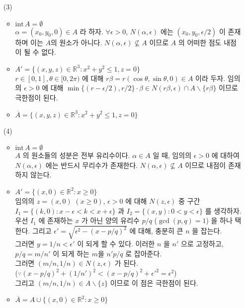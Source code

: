 \documentclass[12pt]{report}
\newcommand{\inte}{\mathrm{int}\,}
\newcommand{\bs}{\backslash}
\newcommand{\R}{\mathbb{R}}
\begin{document}
\begin{enumerate}
\begin{enumerate}
	\item[(3)]
	\begin{itemize}
		\item $\inte A = \emptyset $\\
		$\alpha = (x_0, y_0, 0) \in A$ 라 하자. $\forall \epsilon>0$, $N(\alpha, \epsilon)$ 에는 $(x_0, y_0, \epsilon/2)$ 이 존재하며 이는 $A$의 원소가 아니다. $N(\alpha, \epsilon) \nsubseteq A$ 이므로 $A$ 의 어떠한 점도 내점이 될 수 없다.
		\item $A' = \{(x, y, z)\in \R^3: x^2+y^2 \leq 1, z=0 \}$\\
		$r\in [0, 1], \theta \in [0, 2\pi)$ 에 대해 $r\beta = r(\cos\theta, \sin\theta, 0)\in A$ 이라 두자. 임의의 $\epsilon>0$ 에 대해 $\min\{(r - \epsilon/2), r/2\} \cdot \beta \in N(r\beta, \epsilon)\cap A\bs \{r\beta\}$ 이므로 극한점이 된다.
		\item $\overline{A} = \{(x, y, z)\in \R^3: x^2+y^2 \leq 1, z=0 \}$
	\end{itemize}

	\item[(4)]
	\begin{itemize}
		\item $\inte A = \emptyset$\\
		$A$ 의 원소들의 성분은 전부 유리수이다. $\alpha \in A$ 일 때, 임의의 $\epsilon > 0$ 에 대하여 $N(\alpha, \epsilon)$ 에는 반드시 무리수가 존재한다. $N(\alpha, \epsilon) \nsubseteq A$ 이므로 내점이 존재하지 않는다.
		\item $A' = \{(x, 0) \in \R^2: x\geq0  \}$\\
		임의의 $z = (x, 0)$ $(x \geq 0)$, $\epsilon > 0$ 에 대해 $N(z, \epsilon)$ 중 구간 $I_1 = \{(k, 0): x - \epsilon < k <x + \epsilon\}$ 과 $I_2 = \{(x, y): 0 < y < \epsilon \}$ 를 생각하자. \\
		우선 $I_1$ 에 존재하는 $x$ 가 아닌 양의 유리수 $p/q$ ($\gcd(p, q) = 1$) 을 하나 택한다. 그리고 $\epsilon' = \sqrt{\epsilon^2 - (x - p/q)^2}$ 에 대해, 충분히 큰 $n$ 을 잡는다. \\
		그러면 $y = 1/n < \epsilon'$ 이 되게 할 수 있다. 이러한 $n$ 을 $n'$ 으로 고정하고, $p/q = m/n'$ 이 되게 하는 $m$을 $n'p/q$ 로 잡아준다. \\
		그러면 $\left(m/n, 1/n\right) \in N(z, \epsilon)$ 가 된다.\\
		($\because (x-p/q)^2 + (1/n')^2 < (x-p/q)^2 + \epsilon'^2 = \epsilon^2$) \\
		그리고 $(m/n, 1/n)\in A\bs \{z\}$ 이므로 이 점은 극한점이 된다.
		\item $\overline{A} = A\cup \{(x, 0) \in \R^2: x\geq 0\}$
	\end{itemize}


\end{enumerate}
\end{enumerate}
\end{document}
